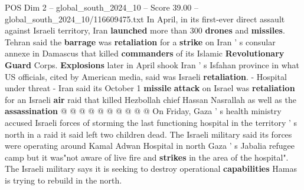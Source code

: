 \begin{textsample}{POS Dim 2 – global\_south\_2024\_10 – Score 39.00 – global\_south\_2024\_10/116609475.txt}
In April, in its first-ever direct assault against Israeli territory, Iran \textbf{launched} more than 300 \textbf{drones} and \textbf{missiles}.
Tehran said the \textbf{barrage} was \textbf{retaliation} for a \textbf{strike} on Iran ' s consular annexe in Damascus that killed \textbf{commanders} of its Islamic \textbf{Revolutionary} \textbf{Guard} Corps. \textbf{Explosions} later in April shook Iran ' s Isfahan province in what US officials, cited by American media, said was Israeli \textbf{retaliation}. - Hospital under threat - Iran said its October 1 \textbf{missile} \textbf{attack} on Israel was \textbf{retaliation} for an Israeli \textbf{air} raid that killed Hezbollah chief Hassan Nasrallah as well as the \textbf{assassination} @ @ @ @ @ @ @ @ @ @ On Friday, Gaza ' s health ministry accused Israeli forces of storming the last functioning hospital in the territory ' s north in a raid it said left two children dead.
The Israeli military said its forces were operating around Kamal Adwan Hospital in north Gaza ' s Jabalia refugee camp but it was"not aware of live fire and \textbf{strikes} in the area of the hospital".
The Israeli military says it is seeking to destroy operational \textbf{capabilities} Hamas is trying to rebuild in the north.

\end{textsample}
